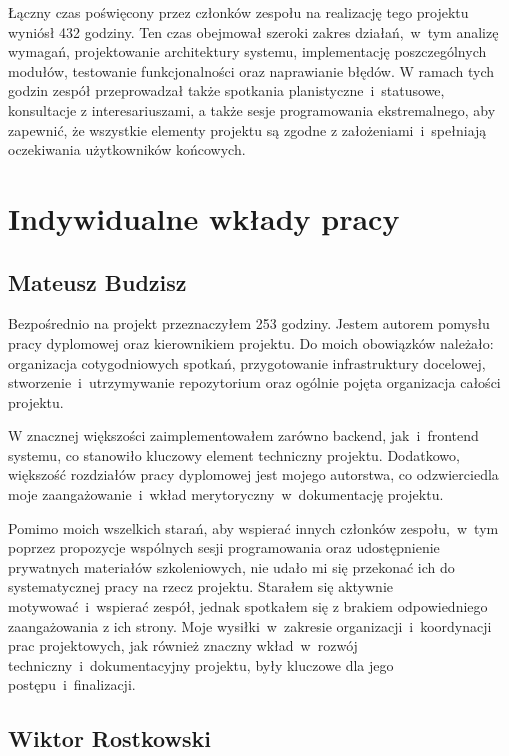 Łączny czas poświęcony przez członków zespołu na realizację tego projektu wyniósł 432 godziny.
Ten czas obejmował szeroki zakres działań,~w~tym analizę wymagań, projektowanie architektury systemu, implementację poszczególnych modułów, testowanie funkcjonalności oraz naprawianie błędów.
W ramach tych godzin zespół przeprowadzał także spotkania planistyczne~i~statusowe, konsultacje z interesariuszami, a także sesje programowania ekstremalnego, aby zapewnić, że wszystkie elementy projektu są zgodne z założeniami~i~spełniają oczekiwania użytkowników końcowych.

\section{Indywidualne wkłady pracy}
\label{sec:indywidualne-wklady-pracy}

\subsection{Mateusz Budzisz}
\label{subsec:mateusz-budzisz}

Bezpośrednio na projekt przeznaczyłem 253 godziny.
Jestem autorem pomysłu pracy dyplomowej oraz kierownikiem projektu.
Do moich obowiązków należało: organizacja cotygodniowych spotkań, przygotowanie infrastruktury docelowej, stworzenie~i~utrzymywanie repozytorium oraz ogólnie pojęta organizacja całości projektu.

W znacznej większości zaimplementowałem zarówno backend, jak~i~frontend systemu, co stanowiło kluczowy element techniczny projektu.
Dodatkowo, większość rozdziałów pracy dyplomowej jest mojego autorstwa, co odzwierciedla moje zaangażowanie~i~wkład merytoryczny~w~dokumentację projektu.

Pomimo moich wszelkich starań, aby wspierać innych członków zespołu,~w~tym poprzez propozycje wspólnych sesji programowania oraz udostępnienie prywatnych materiałów szkoleniowych, nie udało mi się przekonać ich do systematycznej pracy na rzecz projektu.
Starałem się aktywnie motywować~i~wspierać zespół, jednak spotkałem się z brakiem odpowiedniego zaangażowania z ich strony.
Moje wysiłki~w~zakresie organizacji~i~koordynacji prac projektowych, jak również znaczny wkład~w~rozwój techniczny~i~dokumentacyjny projektu, były kluczowe dla jego postępu~i~finalizacji.

\subsection{Wiktor Rostkowski}
\label{subsec:wiktor-rostkowski}

